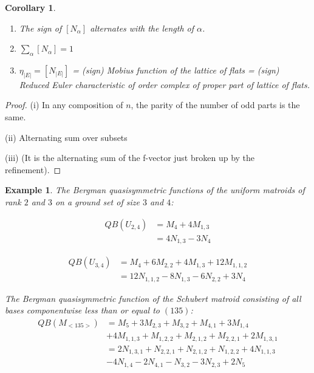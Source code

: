 \documentclass[12pt,reqno]{amsart}
\numberwithin{definition}{section}
\newtheorem{corollary}[definition]{Corollary}
\newtheorem{example}[definition]{Example}
\begin{document}
\begin{corollary}
\begin{enumerate}
\item The sign of $[N_{\alpha}]$ alternates with the length of $\alpha$.  
\item $\sum_{\alpha} [N_{\alpha}] = 1$ 
\item $\eta_{|E|} = [N_{|E|}]$ = (sign) Mobius function of the lattice
of flats = (sign) Reduced Euler characteristic of order complex of
proper part of lattice of flats.
\end{enumerate}
\end{corollary}

\begin{proof}

(i) In any composition of $n$, the parity of the number of odd parts is the same.

(ii) Alternating sum over subsets

(iii) (It is the alternating sum of the f-vector just broken up by the refinement).

\end{proof}

\begin{example}


The Bergman quasisymmetric functions of the uniform matroids of rank $2$ and $3$ on a ground set of size $3$ and $4$:

\begin{align*}
QB(U_{2,4}) & = M_4 + 4M_{1,3}\\
& = 4N_{1,3} - 3N_4
\end{align*}

\begin{align*}
QB(U_{3,4}) & =  M_4 + 6M_{2,2} + 4M_{1,3} + 12M_{1,1,2}\\
            & =  12 N_{1,1,2} - 8 N_{1,3} - 6N_{2,2} + 3N_4
\end{align*}

The Bergman quasisymmetric function of the Schubert matroid consisting of all bases componentwise less than or equal to $(135)$:
\begin{align*}
QB(M_{<135>}) & =  M_5 + 3M_{2,3} + M_{3,2} + M_{4,1} + 3M_{1,4} \\ & + 4M_{1,1,3} + M_{1,2,2} + M_{2,1,2} + M_{2,2,1} + 2M_{1,3,1}\\
&  =  2N_{1,3,1} + N_{2,2,1} + N_{2,1,2} + N_{1,2,2} + 4N_{1,1,3} \\ & - 4 N_{1,4} - 2N_{4,1} - N_{3,2} - 3N_{2,3} + 2N_5
\end{align*}

\end{example}
\end{document}
